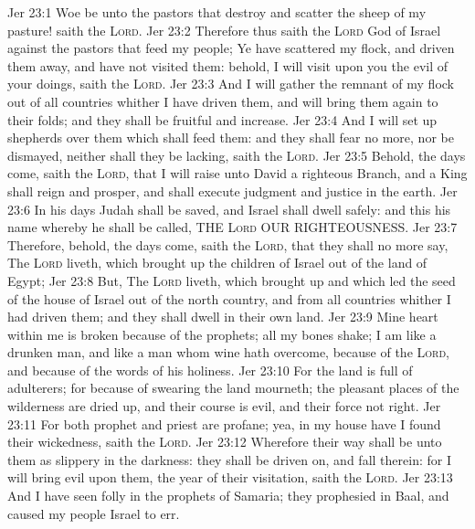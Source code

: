 \vs Jer 23:1 Woe be unto the pastors that destroy and scatter the sheep of my pasture! saith the \textsc{Lord}.
\vs Jer 23:2 Therefore thus saith the \textsc{Lord} God of Israel against the pastors that feed my people; Ye have scattered my flock, and driven them away, and have not visited them: behold, I will visit upon you the evil of your doings, saith the \textsc{Lord}.
\vs Jer 23:3 And I will gather the remnant of my flock out of all countries whither I have driven them, and will bring them again to their folds; and they shall be fruitful and increase.
\vs Jer 23:4 And I will set up shepherds over them which shall feed them: and they shall fear no more, nor be dismayed, neither shall they be lacking, saith the \textsc{Lord}.
\vs Jer 23:5 Behold, the days come, saith the \textsc{Lord}, that I will raise unto David a righteous Branch, and a King shall reign and prosper, and shall execute judgment and justice in the earth.
\vs Jer 23:6 In his days Judah shall be saved, and Israel shall dwell safely: and this  his name whereby he shall be called, THE \textsc{Lord} OUR RIGHTEOUSNESS.
\vs Jer 23:7 Therefore, behold, the days come, saith the \textsc{Lord}, that they shall no more say, The \textsc{Lord} liveth, which brought up the children of Israel out of the land of Egypt;
\vs Jer 23:8 But, The \textsc{Lord} liveth, which brought up and which led the seed of the house of Israel out of the north country, and from all countries whither I had driven them; and they shall dwell in their own land.
\vs Jer 23:9 Mine heart within me is broken because of the prophets; all my bones shake; I am like a drunken man, and like a man whom wine hath overcome, because of the \textsc{Lord}, and because of the words of his holiness.
\vs Jer 23:10 For the land is full of adulterers; for because of swearing the land mourneth; the pleasant places of the wilderness are dried up, and their course is evil, and their force  not right.
\vs Jer 23:11 For both prophet and priest are profane; yea, in my house have I found their wickedness, saith the \textsc{Lord}.
\vs Jer 23:12 Wherefore their way shall be unto them as slippery  in the darkness: they shall be driven on, and fall therein: for I will bring evil upon them,  the year of their visitation, saith the \textsc{Lord}.
\vs Jer 23:13 And I have seen folly in the prophets of Samaria; they prophesied in Baal, and caused my people Israel to err.
